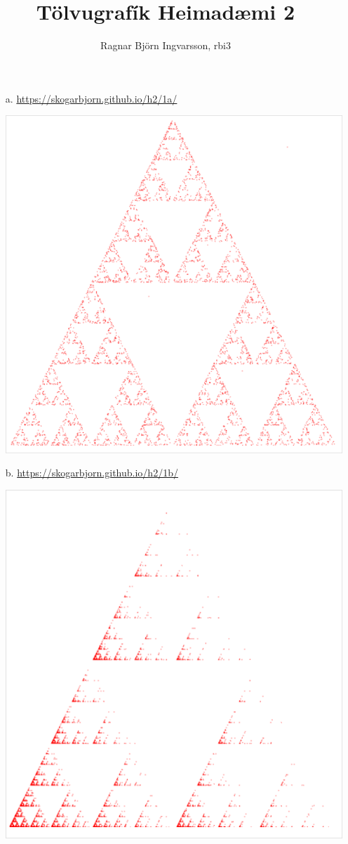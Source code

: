 \documentclass{article}
\title{Tölvugrafík Heimadæmi 2}
\author{Ragnar Björn Ingvarsson, rbi3}
\begin{document}
	\maketitle
	\section{}
	\begin{itemize}
		\item[a.] \url{https://skogarbjorn.github.io/h2/1a/}

			\includegraphics[scale=0.45]{far.png}

			\newpage
		\item[b.] \url{https://skogarbjorn.github.io/h2/1b/}

			\includegraphics[scale=0.45]{weighted.png}


\end{itemize}
\end{document}
